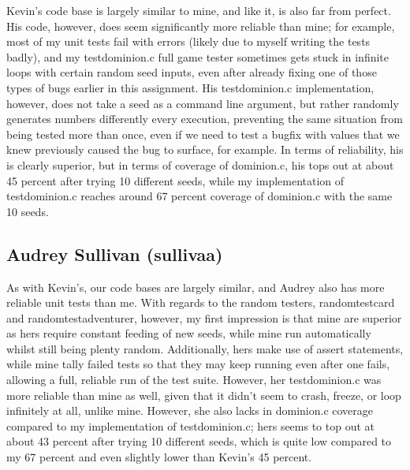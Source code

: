 \documentclass[letterpaper,10pt,fleqn]{article}
\numberwithin{equation}{section}
\begin{document}
Kevin's code base is largely similar to mine, and like it, is also far from perfect.  His code, however, does seem significantly more reliable than mine; for example, most of my unit tests fail with errors (likely due to myself writing the tests badly), and my testdominion.c full game tester sometimes gets stuck in infinite loops with certain random seed inputs, even after already fixing one of those types of bugs earlier in this assignment.  His testdominion.c implementation, however, does not take a seed as a command line argument, but rather randomly generates numbers differently every execution, preventing the same situation from being tested more than once, even if we need to test a bugfix with values that we knew previously caused the bug to surface, for example.  In terms of reliability, his is clearly superior, but in terms of coverage of dominion.c, his tops out at about 45 percent after trying 10 different seeds, while my implementation of testdominion.c reaches around 67 percent coverage of dominion.c with the same 10 seeds.

\subsection*{Audrey Sullivan (sullivaa)}

As with Kevin's, our code bases are largely similar, and Audrey also has more reliable unit tests than me.  With regards to the random testers, randomtestcard and randomtestadventurer, however, my first impression is that mine are superior as hers require constant feeding of new seeds, while mine run automatically whilst still being plenty random.  Additionally, hers make use of assert statements, while mine tally failed tests so that they may keep running even after one fails, allowing a full, reliable run of the test suite.  However, her testdominion.c was more reliable than mine as well, given that it didn't seem to crash, freeze, or loop infinitely at all, unlike mine.  However, she also lacks in dominion.c coverage compared to my implementation of testdominion.c; hers seems to top out at about 43 percent after trying 10 different seeds, which is quite low compared to my 67 percent and even slightly lower than Kevin's 45 percent.
\end{document}
